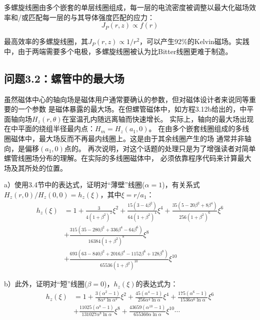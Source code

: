 多螺旋线圈由多个嵌套的单层线圈组成，每一层的电流密度被调整以最大化磁场效率和/或匹配每一层的与其导体强度匹配的应力：
\begin{equation}
J_P(r,z)\propto f(r)%
\end{equation}

最高效率的多螺旋线圈，其$J_P(r,z)\propto 1/r^2$，可以产生92\%的Kelvin磁场。实践中，由于两端需要多个电极，多螺旋线圈被认为比Bitter线圈更难于制造。
\newpage


\subsection{问题3.2：螺管中的最大场}
虽然磁体中心的轴向场是磁体用户通常要确认的参数，但对磁体设计者来说同等重要的一个参数
是磁体暴露的最大场。在但螺管磁体中，如方程3.12b给出的，中平面轴向场$H_z(r,
\theta)$在室温孔内随远离轴而快速增长。
实际上，轴向的最大场出现在中平面的绕组半径最内点：$H_m=H_z(a_1,0)$。
在由多个嵌套线圈组成的多线圈磁体中，最大场反而不再最内线圈上。这是由于其余线圈产生的场
通常并非轴向，是偏移$(a_1,0)$点的。
再次说明，对这个话题的处理只是为了增强读者对简单螺管线圈场分布的理解。在实际的多线圈磁体中，
必须依靠程序代码来计算最大场及其所处的位置。

a）使用3.4节中的表达式，证明对“薄壁”线圈($\alpha=1$)，有关系式$H_z(r,0)/H_z(0,0)=h_z(\xi)$，其中$\xi=r/a_1$：
\begin{equation}
\begin{split}
h_z(\xi)&=1+\frac{3}{4(1+\beta^2)^2}\xi^2+\frac{15(3-4\beta^2)}{64(1+\beta^2)^4}\xi^4+\frac{35(5-20\beta^2+8\beta^4)}{256(1+\beta^2)^6}\xi^6\\
&+\frac{315(35-280\beta^2+336\beta^4-64\beta^6)}{16384(1+\beta^2)^8}\xi^8\\
&+\frac{693(63-840\beta^2+2016\beta^4-1152\beta^6+128\beta^8)}{65536(1+\beta^2)^{10}}\xi^{10}%
\end{split}
\end{equation}

b）此外，证明对“短”线圈($\beta=0$)，$h_z(\xi)$的表达式为：
\begin{equation}
\begin{split}
h_z(\xi)&=1+\frac{3(\alpha^2-1)}{8\alpha^2\ln\alpha^2}\xi^2+\frac{45(\alpha^4-1)}{256\alpha^4\ln\alpha}\xi^4+\frac{175(\alpha^6-1)}{1536\alpha^6\ln\alpha}\xi^6\\
&+\frac{11025(\alpha^8-1)}{131027\alpha^8\ln\alpha}\xi^8+\frac{43659(\alpha^10-1)}{655360\alpha\ln\alpha}\xi^{10}\cdots%
\end{split}
\end{equation}

